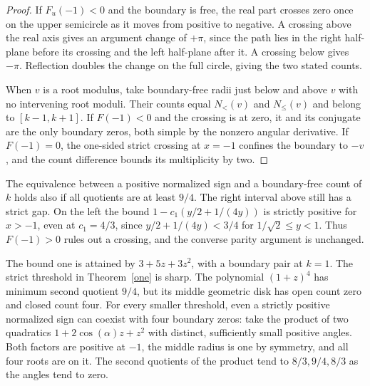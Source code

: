 \documentclass[11pt]{article}
\begin{document}
\begin{proof}
If $F_u(-1)<0$ and the boundary is free, the real part crosses zero once on the upper semicircle as it moves from positive to negative. A crossing above the real axis gives an argument change of $+\pi$, since the path lies in the right half-plane before its crossing and the left half-plane after it. A crossing below gives $-\pi$. Reflection doubles the change on the full circle, giving the two stated counts.

When $v$ is a root modulus, take boundary-free radii just below and above $v$ with no intervening root moduli. Their counts equal $N_{<}(v)$ and $N_{\le}(v)$ and belong to $[k-1,k+1]$. If $F(-1)<0$ and the crossing is at zero, it and its conjugate are the only boundary zeros, both simple by the nonzero angular derivative. If $F(-1)=0$, the one-sided strict crossing at $x=-1$ confines the boundary to $-v$, and the count difference bounds its multiplicity by two.
\end{proof}

The equivalence between a positive normalized sign and a boundary-free count of $k$ holds also if all quotients are at least $9/4$. The right interval above still has a strict gap. On the left the bound $1-c_1(y/2+1/(4y))$ is strictly positive for $x>-1$, even at $c_1=4/3$, since $y/2+1/(4y)<3/4$ for $1/\sqrt2\le y<1$. Thus $F(-1)>0$ rules out a crossing, and the converse parity argument is unchanged.

The bound one is attained by $3+5z+3z^2$, with a boundary pair at $k=1$. The strict threshold in Theorem~\ref{one} is sharp. The polynomial $(1+z)^4$ has minimum second quotient $9/4$, but its middle geometric disk has open count zero and closed count four. For every smaller threshold, even a strictly positive normalized sign can coexist with four boundary zeros: take the product of two quadratics $1+2\cos(\alpha)z+z^2$ with distinct, sufficiently small positive angles. Both factors are positive at $-1$, the middle radius is one by symmetry, and all four roots are on it. The second quotients of the product tend to $8/3,9/4,8/3$ as the angles tend to zero.
\end{document}
